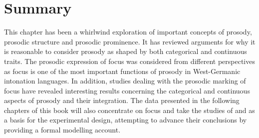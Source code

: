 \section{Summary}
\label{sec:summary_prosody}

This chapter has been a whirlwind exploration of important concepts of prosody, prosodic structure and prosodic prominence. It has reviewed arguments for why it is reasonable to consider prosody as shaped by both categorical and continuous traits. The prosodic expression of focus was considered from different perspectives as focus is one of the most important functions of prosody in West-Germanic intonation languages. In addition, studies dealing with the prosodic marking of focus have revealed interesting results concerning the categorical and continuous aspects of prosody and their integration. The data presented in the following chapters of this book will also concentrate on focus and take the studies of \citet{MückeGrice2014} and \citet{Griceetal2017} as a basis for the experimental design, attempting to advance their conclusions by providing a formal modelling account.



